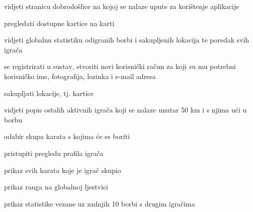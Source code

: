			
			\begin{packed_enum}
				\item  {}
				
				\begin{packed_enum}
					
					\item vidjeti stranicu dobrodošlice na kojoj se nalaze upute za korištenje aplikacije
					\item pregledati dostupne kartice na karti
					\item vidjeti globalnu statistiku odigranih borbi i sakupljenih lokacija te poredak svih igrača
					\item se registrirati u sustav, stvoriti novi korisnički račun za koji su mu potrebni korisničko ime, fotografija, lozinka i e-mail adresa
					
				\end{packed_enum}
			
				\item  {}
				
				\begin{packed_enum}
					
					\item sakupljati lokacije, tj. kartice
					\item vidjeti popis ostalih aktivnih igrača koji se nalaze unutar 50 km i s njima ući u borbu
					
					\begin{packed_enum}
					    
					    \item odabir skupa karata s kojima će se boriti
					    
					\end{packed_enum}
					
					\item pristupiti pregledu profila igrača
					
					\begin{packed_enum}
					    
					    \item prikaz svih karata koje je igrač skupio
					    \item prikaz ranga na globalnoj ljestvici
					    \item prikaz statistike vezane uz zadnjih 10 borbi s drugim igračima
					    
					\end{packed_enum}
					

\end{packed_enum}
\end{packed_enum}
